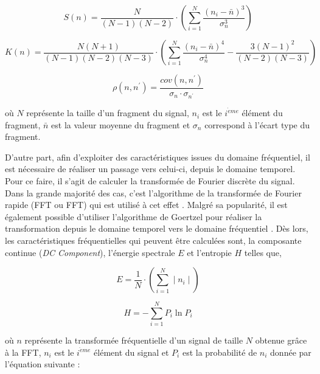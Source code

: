 \begin{equation}
	\label{eq:asymetrie}
	S \left(n\right) = \frac{N}{(N-1)(N-2)} \cdot \left(\sum_{i=1}^{N}{\frac{(n_i-\bar{n})^3}{\sigma_n^3}}\right)
\end{equation}

\begin{equation}
	\label{eq:kurtosis}
	K \left(n\right) = \frac{N(N+1)}{(N-1)(N-2)(N-3)} \cdot \left(\sum_{i=1}^{N}{\frac{(n_i-\bar{n})^4}{\sigma_n^4}-\frac{3(N-1)^2}{(N-2)(N-3)}}\right)
\end{equation}

\begin{equation}
	\label{eq:correlation}
	\rho\left(n, n^{\prime}\right) = \frac{cov\left(n, n^{\prime}\right)}{\sigma_n\cdot\sigma_{n^{\prime}}}
\end{equation}

\noindent où $N$ représente la taille d'un fragment du signal, $n_i$ est le $i^{\grave{e}me}$ élément du fragment, $\bar{n}$ est la valeur moyenne du fragment et $\sigma_n$ correspond à l'écart type du fragment.

D'autre part, afin d'exploiter des caractéristiques issues du domaine fréquentiel, il est nécessaire de réaliser un passage vers celui-ci, depuis le domaine temporel. Pour ce faire, il s'agit de calculer la transformée de Fourier discrète du signal. Dans la grande majorité des cas, c'est l'algorithme de la transformée de Fourier rapide (\acl{FFT} ou \acs{FFT}) qui est utilisé à cet effet \citep{Brigham1967}. Malgré sa popularité, il est également possible d'utiliser l'algorithme de Goertzel pour réaliser la transformation depuis le domaine temporel vers le domaine fréquentiel \citep{Sysel2012}. Dès lors, les caractéristiques fréquentielles qui peuvent être calculées sont, la composante continue (\textit{DC Component}), l'énergie spectrale $E$ et l'entropie $H$ telles que,

\begin{equation}
	\label{eq:energy_spec}
	E = \frac{1}{N}\cdot\left(\sum_{i=1}^{N}\mid{}n_i\mid\right)
\end{equation}

\begin{equation}
	\label{eq:entropy}
	H = - \sum_{i=1}^{N}{P_i}\ln P_i
\end{equation}

\noindent où $n$ représente la transformée fréquentielle d'un signal de taille $N$ obtenue grâce à la \acs{FFT}, $n_i$ est le $i^{\grave{e}me}$ élément du signal et $P_i$ est la probabilité de $n_i$ donnée par l'équation suivante :

